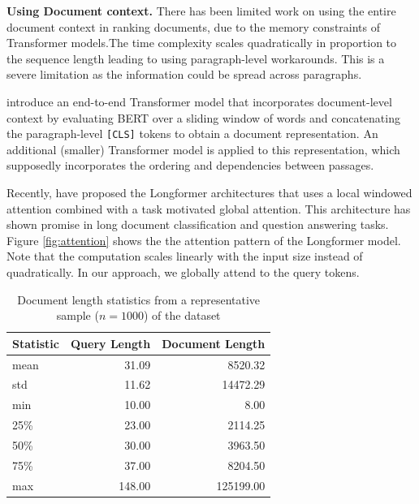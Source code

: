 \documentclass[sigconf, nonacm=true]{acmart}
\begin{document}
\noindent \textbf{Using Document context.} There has been limited work on using the entire document context in ranking documents, due to the memory constraints of Transformer models.The time complexity scales quadratically in proportion to the sequence length leading to using paragraph-level workarounds. This is a severe limitation as the information could be spread across paragraphs. 

\citeauthor{Li2020PARADEPR} introduce an end-to-end Transformer model that incorporates document-level context by evaluating BERT over a sliding window of words and concatenating the paragraph-level \texttt{[CLS]} tokens to obtain a document representation. An additional (smaller) Transformer model is applied to this representation, which supposedly incorporates the ordering and dependencies between passages.

Recently, \citeauthor{Beltagy2020LongformerTL} have proposed the Longformer architectures that uses a local windowed attention combined with a task motivated global attention. This architecture has shown promise in long document classification and question answering tasks. Figure \ref{fig:attention} shows the the attention pattern of the Longformer model. Note that the computation scales linearly with the input size instead of quadratically. In our approach, we globally attend to the query tokens.

\begin{table}[!h]
  \caption{Document length statistics from a representative sample ($n=1000$) of the dataset}
  \label{doc-length}
  \begin{tabular}{lrr}
    \toprule
    Statistic & Query Length & Document Length \\
    \midrule
    mean  &  31.09 &   8520.32 \\
    std   &  11.62 &  14472.29 \\
    min   &  10.00 &      8.00 \\
    25\%   &  23.00 &   2114.25 \\
    50\%   &  30.00 &   3963.50 \\
    75\%   &  37.00 &   8204.50 \\
    max   & 148.00 & 125199.00 \\
  \bottomrule
  \end{tabular}
\end{table}
\end{document}
